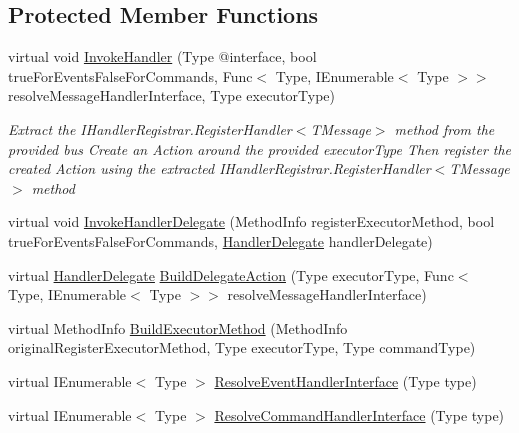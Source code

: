 \subsection*{Protected Member Functions}
\begin{DoxyCompactItemize}
\item 
virtual void \hyperlink{classCqrs_1_1Configuration_1_1BusRegistrar_a159eba5ece9015165be70676a52d8127}{Invoke\+Handler} (Type @interface, bool true\+For\+Events\+False\+For\+Commands, Func$<$ Type, I\+Enumerable$<$ Type $>$$>$ resolve\+Message\+Handler\+Interface, Type executor\+Type)
\begin{DoxyCompactList}\small\item\em Extract the I\+Handler\+Registrar.\+Register\+Handler$<$\+T\+Message$>$ method from the provided {\itshape bus}  Create an Action around the provided {\itshape executor\+Type}  Then register the created Action using the extracted I\+Handler\+Registrar.\+Register\+Handler$<$\+T\+Message$>$ method \end{DoxyCompactList}\item 
virtual void \hyperlink{classCqrs_1_1Configuration_1_1BusRegistrar_a3103da4cf077104607fe03a862958827}{Invoke\+Handler\+Delegate} (Method\+Info register\+Executor\+Method, bool true\+For\+Events\+False\+For\+Commands, \hyperlink{classCqrs_1_1Configuration_1_1HandlerDelegate}{Handler\+Delegate} handler\+Delegate)
\item 
virtual \hyperlink{classCqrs_1_1Configuration_1_1HandlerDelegate}{Handler\+Delegate} \hyperlink{classCqrs_1_1Configuration_1_1BusRegistrar_a07d27088739f2ae0ac7c551fc6a72ac9}{Build\+Delegate\+Action} (Type executor\+Type, Func$<$ Type, I\+Enumerable$<$ Type $>$$>$ resolve\+Message\+Handler\+Interface)
\item 
virtual Method\+Info \hyperlink{classCqrs_1_1Configuration_1_1BusRegistrar_a03ecf12389b8f55b75c887e113520ac7}{Build\+Executor\+Method} (Method\+Info original\+Register\+Executor\+Method, Type executor\+Type, Type command\+Type)
\item 
virtual I\+Enumerable$<$ Type $>$ \hyperlink{classCqrs_1_1Configuration_1_1BusRegistrar_a0af1844a5f7f1c4adfde2499b054aaae}{Resolve\+Event\+Handler\+Interface} (Type type)
\item 
virtual I\+Enumerable$<$ Type $>$ \hyperlink{classCqrs_1_1Configuration_1_1BusRegistrar_a0e118c57c7e804df1d810750befb25df}{Resolve\+Command\+Handler\+Interface} (Type type)
\end{DoxyCompactItemize}

